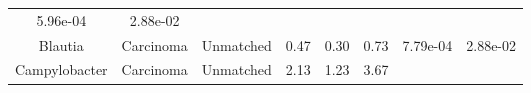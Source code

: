 \documentclass[12pt,]{article}
\begin{document}
\begin{longtable}[]{@{}cccccccc@{}}
\begin{minipage}[t]{0.06\columnwidth}
5.96e-04\strut
\end{minipage} & \begin{minipage}[t]{0.06\columnwidth}\centering\strut
2.88e-02\strut
\end{minipage}\tabularnewline
\begin{minipage}[t]{0.18\columnwidth}\centering\strut
Blautia\strut
\end{minipage} & \begin{minipage}[t]{0.07\columnwidth}\centering\strut
Carcinoma\strut
\end{minipage} & \begin{minipage}[t]{0.09\columnwidth}\centering\strut
Unmatched\strut
\end{minipage} & \begin{minipage}[t]{0.03\columnwidth}\centering\strut
0.47\strut
\end{minipage} & \begin{minipage}[t]{0.14\columnwidth}\centering\strut
0.30\strut
\end{minipage} & \begin{minipage}[t]{0.14\columnwidth}\centering\strut
0.73\strut
\end{minipage} & \begin{minipage}[t]{0.06\columnwidth}\centering\strut
7.79e-04\strut
\end{minipage} & \begin{minipage}[t]{0.06\columnwidth}\centering\strut
2.88e-02\strut
\end{minipage}\tabularnewline
\begin{minipage}[t]{0.18\columnwidth}\centering\strut
Campylobacter\strut
\end{minipage} & \begin{minipage}[t]{0.07\columnwidth}\centering\strut
Carcinoma\strut
\end{minipage} & \begin{minipage}[t]{0.09\columnwidth}\centering\strut
Unmatched\strut
\end{minipage} & \begin{minipage}[t]{0.03\columnwidth}\centering\strut
2.13\strut
\end{minipage} & \begin{minipage}[t]{0.14\columnwidth}\centering\strut
1.23\strut
\end{minipage} & \begin{minipage}[t]{0.14\columnwidth}\centering\strut
3.67\strut
\end{minipage} & \begin{minipage}[t]{0.06\columnwidth}\centering\strut

\end{minipage}
\end{longtable}
\end{document}
